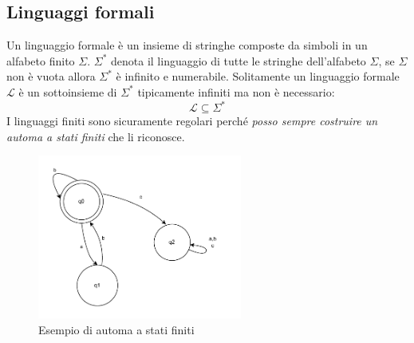 \documentclass[a4paper]{article}
\begin{document}
\subsection{Linguaggi formali}
{
    Un linguaggio formale è un insieme di stringhe composte da simboli in un alfabeto finito $\Sigma$.
}
\noindent
$\Sigma^*$ denota il linguaggio di tutte le stringhe dell'alfabeto $\Sigma$, se $\Sigma$ non è vuota allora $\Sigma^*$ è 
infinito e numerabile.
Solitamente un linguaggio formale $\mathcal{L}$ è un sottoinsieme di $\Sigma^*$ tipicamente infiniti ma non è necessario:
\[\mathcal{L} \subseteq \Sigma^*\]
I linguaggi finiti sono sicuramente regolari perché \textit{posso sempre costruire un automa a stati finiti} che li riconosce.

\begin{figure}[H]
    \centering
\end{figure}


\begin{figure}[H]
    \centering
    \includegraphics[width=0.6\textwidth]{automa.pdf}
    \caption{Esempio di automa a stati finiti}
\end{figure}
\end{document}
